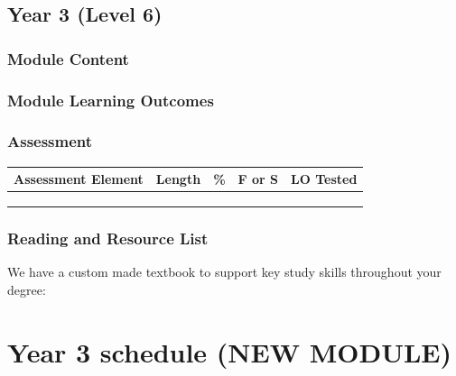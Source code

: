 \documentclass[
  11pt,
  letterpaper,
  oneside,
  open=any]{scrbook}
\begin{document}
\hypertarget{year-3-level-6}{%
\section{Year 3 (Level 6)}\label{year-3-level-6}}

\hypertarget{module-content-3}{%
\subsection{Module Content}\label{module-content-3}}

\hypertarget{module-learning-outcomes-3}{%
\subsection{Module Learning Outcomes}\label{module-learning-outcomes-3}}

\hypertarget{assessment-3}{%
\subsection{Assessment}\label{assessment-3}}

\begin{longtable}[]{@{}lllll@{}}
\toprule()
Assessment Element & Length & \% & F or S & LO Tested \\
\midrule()
\endhead
& & & & \\
& & & & \\
& & & & \\
\bottomrule()
\end{longtable}

\hypertarget{reading-and-resource-list-3}{%
\subsection{Reading and Resource
List}\label{reading-and-resource-list-3}}

We have a custom made textbook to support key study skills throughout
your degree:

\hypertarget{year-3-schedule-new-module}{%
\chapter{Year 3 schedule (NEW
MODULE)}\label{year-3-schedule-new-module}}
\end{document}
